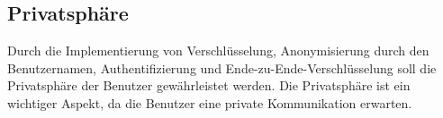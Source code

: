 \subsection{Privatsphäre}

Durch die Implementierung von Verschlüsselung, Anonymisierung durch den Benutzernamen, Authentifizierung und 
Ende-zu-Ende-Verschlüsselung soll die Privatsphäre der Benutzer gewährleistet werden. 
Die Privatsphäre ist ein wichtiger Aspekt, da die Benutzer eine private Kommunikation erwarten.
